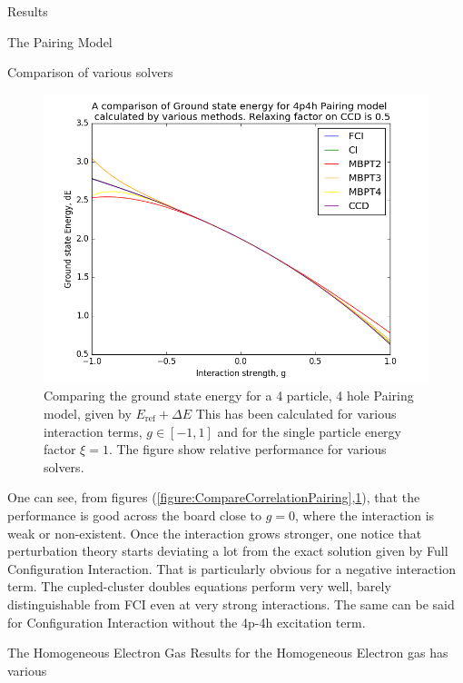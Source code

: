 \documentclass[twoside,english]{uiofysmaster}
\begin{document}
\begin{chapter}{Results}
\begin{section}{The Pairing Model}
\begin{subsection}{Comparison of various solvers}
			\begin{figure}[H]
				\includegraphics[width=\linewidth]{../Pairing_Model/Results/Figures/Pairing4p4h_CompareE_AllMethods.png}
				\caption{Comparing the ground state energy for a 4 particle, 4 hole Pairing model, given by $E_{\text{ref}} + \Delta E$ This has been calculated for various interaction terms, $g \in [-1,1]$ and for the single particle energy factor $\xi = 1$. The figure show relative performance for various solvers.}
				\label{figure:CompareEnergyPairing}
			\end{figure}
			One can see, from figures (\ref{figure:CompareCorrelationPairing},\ref{figure:CompareEnergyPairing}), that the performance is good across the board close to $g = 0$, where the interaction is weak or non-existent. Once the interaction grows stronger, one notice that perturbation theory starts deviating a lot from the exact solution given by Full Configuration Interaction. That is particularly obvious for a negative interaction term. The cupled-cluster doubles equations perform very well, barely distinguishable from FCI even at very strong interactions. The same can be said for Configuration Interaction without the 4p-4h excitation term.  
		\end{subsection}

	\end{section}

	\newpage

	\begin{section}{The Homogeneous Electron Gas}
		Results for the Homogeneous Electron gas has various 


\end{section}
\end{chapter}
\end{document}
